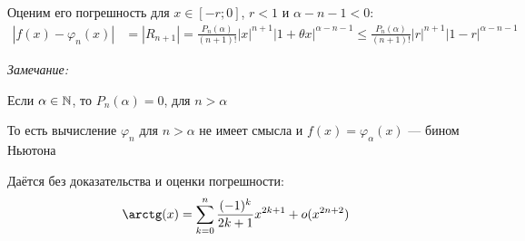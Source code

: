 \documentclass{article}
\begin{document}
Оценим его погрешность для $x\in[-r;0]$, $r<1$ и $\alpha-n-1< 0$:
\begin{align*}
	|f(x)-\varphi_{n}(x)| & =|R_{n+1}|=\frac{P_{n}(\alpha)}{(n+1)!}|x|^{n+1}|1+\theta x|^{\alpha-n-1}
	\leq\frac{P_{n}(\alpha)}{(n+1)!}|r|^{n+1}|1-r|^{\alpha-n-1}
\end{align*}

{\it Замечание:}

Если $\alpha\in\mathbb{N}$, то $P_{n}(\alpha)=0$, для $n>\alpha$

То есть вычисление $\varphi_{n}$ для $n>\alpha$ не имеет смысла и $f(x)=\varphi_{\alpha}(x)$ --- бином Ньютона


Даётся без доказательства и оценки погрешности:
\begin{align*}
	\arctg(x)=\sum_{k=0}^{n}\frac{(-1)^{k}}{2k+1}x^{2k+1}+o(x^{2n+2})
\end{align*}
\end{document}
